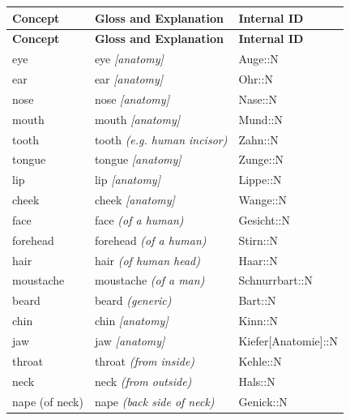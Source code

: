 \begin{center}
\small
\begin{longtable}{lll}
\hline\hline
\textbf{Concept} & \textbf{Gloss and Explanation} & \textbf{Internal ID}\\
\hline
\endfirsthead
\hline\hline
\textbf{Concept} & \textbf{Gloss and Explanation} & \textbf{Internal ID}\\
\hline
\endhead
\hline
\endfoot
\hline
\endlastfoot

{\sc \lowercase{	EYE	}}	&	eye	\textit{\footnotesize [anatomy]}	&	Auge::N	\\
{\sc \lowercase{	EAR	}}	&	ear	\textit{\footnotesize [anatomy]}	&	Ohr::N	\\
{\sc \lowercase{	NOSE	}}	&	nose	\textit{\footnotesize [anatomy]}	&	Nase::N	\\
{\sc \lowercase{	MOUTH	}}	&	mouth	\textit{\footnotesize [anatomy]}	&	Mund::N	\\
{\sc \lowercase{	TOOTH	}}	&	tooth	\textit{\footnotesize (e.g. human incisor)}	&	Zahn::N	\\
{\sc \lowercase{	TONGUE	}}	&	tongue	\textit{\footnotesize [anatomy]}	&	Zunge::N	\\
{\sc \lowercase{	LIP	}}	&	lip	\textit{\footnotesize [anatomy]}	&	Lippe::N	\\
{\sc \lowercase{	CHEEK	}}	&	cheek	\textit{\footnotesize [anatomy]}	&	Wange::N	\\
{\sc \lowercase{	FACE	}}	&	face	\textit{\footnotesize (of a human)}	&	Gesicht::N	\\
{\sc \lowercase{	FOREHEAD	}}	&	forehead	\textit{\footnotesize (of a human)}	&	Stirn::N	\\
{\sc \lowercase{	HAIR	}}	&	hair	\textit{\footnotesize (of human head)}	&	Haar::N	\\
{\sc \lowercase{	MOUSTACHE	}}	&	moustache	\textit{\footnotesize (of a man)}	&	Schnurrbart::N	\\
{\sc \lowercase{	BEARD	}}	&	beard	\textit{\footnotesize (generic)}	&	Bart::N	\\
{\sc \lowercase{	CHIN	}}	&	chin	\textit{\footnotesize [anatomy]}	&	Kinn::N	\\
{\sc \lowercase{	JAW	}}	&	jaw	\textit{\footnotesize [anatomy]}	&	Kiefer[Anatomie]::N	\\
{\sc \lowercase{	THROAT	}}	&	throat	\textit{\footnotesize (from inside)}	&	Kehle::N	\\
{\sc \lowercase{	NECK	}}	&	neck	\textit{\footnotesize (from outside)}	&	Hals::N	\\
{\sc \lowercase{	NAPE \footnotesize (OF NECK)	}}	&	nape	\textit{\footnotesize (back side of neck)}	&	Genick::N	\\

\end{longtable}
\end{center}
